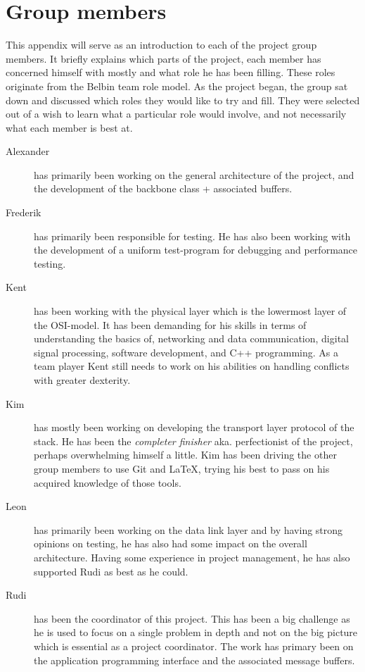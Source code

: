 \chapter{Group members}\label{app:members}
This appendix will serve as an introduction to each of the project group
members. It briefly explains which parts of the project, each member has
concerned himself with mostly and what role he has been filling. These roles
originate from the Belbin team role model. As the project began, the group sat
down and discussed which roles they would like to try and fill. They were
selected out of a wish to learn what a particular role would involve, and not
necessarily what each member is best at.

\begin{description}
\item[Alexander] has primarily been working on the general architecture of the
project, and the development of the backbone class + associated buffers.
\item[Frederik] has primarily been responsible for testing. He has also been
working with the development of a uniform test-program for debugging and
performance testing.
\item[Kent] has been working with the physical layer which is the lowermost
layer of the OSI-model. It has been demanding for his skills in terms of understanding the basics of, networking and data communication, digital signal processing, software development, and C++ programming. As a team player Kent still needs to work on his abilities on handling conflicts with greater dexterity.
\item[Kim] has mostly been working on developing the transport layer protocol of the stack. He has been the \textit{completer finisher} aka. perfectionist of the project, perhaps overwhelming himself a little. Kim has been driving the other group members to use Git and \LaTeX, trying his best to pass on his acquired knowledge of those tools.
\item[Leon] has primarily been working on the data link layer and by having
strong opinions on testing, he has also had some impact on the
overall architecture. Having some experience in project management, he has also
supported Rudi as best as he could.
\item[Rudi] has been the coordinator of this project. This has been a big
challenge as he is used to focus on a single problem in depth and not on the
big picture which is essential as a project coordinator. The work has primary been on the application programming interface and the associated message buffers.
\end{description}
